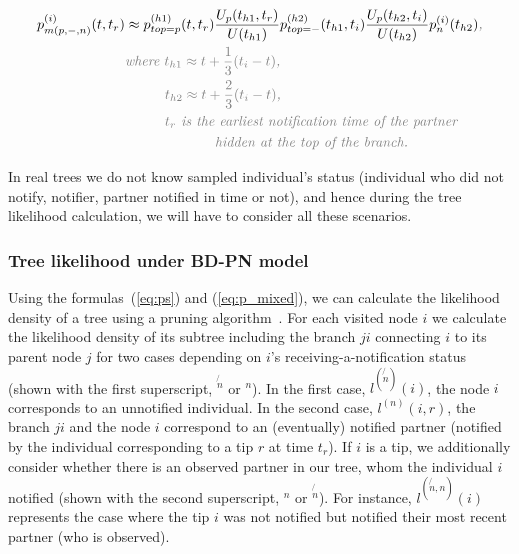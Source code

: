\documentclass[10pt,letterpaper]{article}
\begin{document}
\begin{equation}
\begin{split}
&\\
p_{m(p,-,n)}^{(i)}(t,t_r) &\approx p_{top=p}^{(h1)}(t, t_r)\frac{U_p(t_{h1},t_{r})}{U(t_{h1})} p_{top=-}^{(h2)}(t_{h1}, t_i)\frac{U_p(t_{h2},t_{i})}{U(t_{h2})} p_n^{(i)}(t_{h2})\textit{\color{gray},}\\
&\textit{\color{gray}where $t_{h1} \approx t + \frac{1}{3}(t_i - t)$,}\\
&\textit{\color{gray}~~~~~~~~$t_{h2} \approx t + \frac{2}{3}(t_i - t)$,}\\
&\textit{\color{gray}~~~~~~~~$t_{r}$ is the earliest notification time of the partner }\\
&\textit{\color{gray}~~~~~~~~~~~~~~~~~~hidden at the top of the branch.}\\
\end{split}\label{eq:p_mixed}
\end{equation}



In real trees we do not know sampled individual's status (individual who did not notify, notifier, partner notified in time or not), and hence during the tree likelihood calculation, we will have to consider all these scenarios.

 

\subsubsection*{Tree likelihood under BD-PN model} 

Using the formulas~(\ref{eq:ps}) and (\ref{eq:p_mixed}), we can calculate the likelihood density of a tree using a pruning algorithm~\cite{10.1093/sysbio/22.3.240}. For each visited node $i$ we calculate the likelihood density of its subtree including the branch $ji$ connecting $i$ to its parent node $j$ for two cases depending on $i$'s receiving-a-notification status (shown with the first superscript, $^{\not{n}}$ or $^n$). In the first case,  $l^{(\not{n})}(i)$, the node $i$ corresponds to an unnotified individual. In the second case, $l^{(n)}(i, r)$, the branch $ji$ and the node $i$ correspond to an (eventually) notified partner (notified by the individual corresponding to a tip $r$ at time $t_r$). If $i$ is a tip, we additionally consider whether there is an observed partner in our tree, whom the individual $i$ notified  (shown with the second superscript, $^n$ or $^{\not{n}}$). For instance, $l^{(\not{n},n)}(i)$ represents the case where the tip $i$ was not notified but notified their most recent partner (who is observed). %
\end{document}

